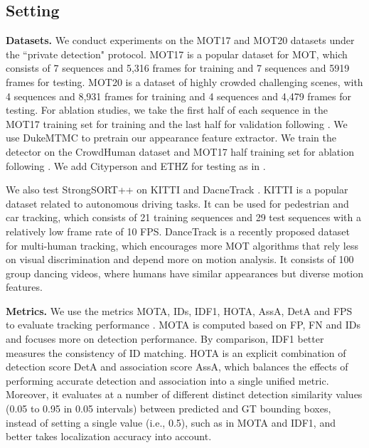 \documentclass[lettersize,journal]{IEEEtran}
\begin{document}
\subsection{Setting}

\noindent \textbf{Datasets.}
We conduct experiments on the MOT17 \cite{milan2016mot16} and MOT20 \cite{dendorfer2020mot20} datasets under the ``private detection" protocol.
MOT17 is a popular dataset for MOT, which consists of 7 sequences and 5,316 frames for training and 7 sequences and 5919 frames for testing.
MOT20 is a dataset of highly crowded challenging scenes, with 4 sequences and 8,931 frames for training and 4 sequences and 4,479 frames for testing.
For ablation studies, we take the first half of each sequence in the MOT17 training set for training 
and the last half for validation following \cite{zhou2020tracking, zhang2022bytetrack}.
We use DukeMTMC \cite{ristani2016performance} to pretrain our appearance feature extractor.
We train the detector on the CrowdHuman dataset \cite{shao2018crowdhuman} and MOT17 half training set for ablation
following \cite{zhou2020tracking, zhang2022bytetrack, sun2020transtrack, wu2021track, zeng2022motr}.
We add Cityperson \cite{zhang2017citypersons} and ETHZ \cite{ess2008mobile} for testing 
as in \cite{zhang2022bytetrack, wang2020towards, zhang2021fairmot, liang2022rethinking}.

We also test StrongSORT++ on KITTI \cite{geiger2013vision} and DacneTrack \cite{sun2022dancetrack}.
KITTI is a popular dataset related to autonomous driving tasks.
It can be used for pedestrian and car tracking, which consists of 21 training sequences and 29 test sequences
with a relatively low frame rate of 10 FPS.
DanceTrack is a recently proposed dataset for multi-human tracking,
which encourages more MOT algorithms that rely less on visual discrimination and depend more on motion analysis.
It consists of 100 group dancing videos, where humans have similar appearances but diverse motion features.

\noindent \textbf{Metrics.}
We use the metrics MOTA, IDs, IDF1, HOTA, AssA, DetA and FPS
to evaluate tracking performance \cite{bernardin2008evaluating, ristani2016performance, luiten2021hota}.
MOTA is computed based on FP, FN and IDs and focuses more on detection performance.
By comparison, IDF1 better measures the consistency of ID matching. 
HOTA is an explicit combination of detection score DetA and association score AssA, 
which balances the effects of performing accurate detection and association into a single unified metric.
Moreover, it evaluates at a number of different distinct detection similarity values (0.05 to 0.95 in 0.05 intervals) between predicted and GT bounding boxes,
instead of setting a single value (i.e., 0.5), such as in MOTA and IDF1, and better takes localization accuracy into account.
\end{document}
